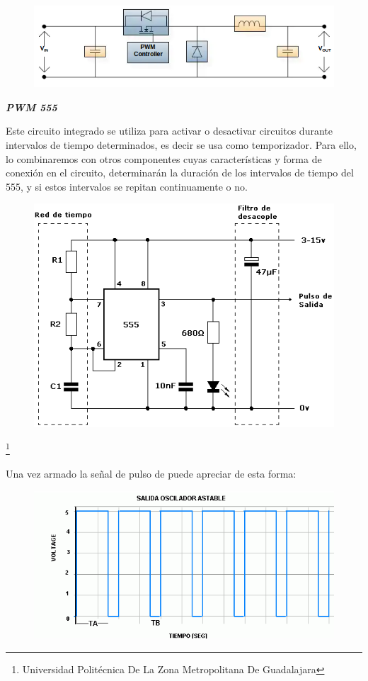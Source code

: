 \documentclass[11pt,a4paper]{article}
\begin{document}
\begin{figure}[hbtp]
\centering
\includegraphics[scale=0.80]{1.png}
\end{figure} 

\textbf{\textit{PWM 555}}


Este circuito integrado se utiliza para activar o desactivar circuitos durante intervalos de tiempo determinados, es decir se usa como temporizador. Para ello, lo combinaremos con otros componentes cuyas características y forma de conexión en el circuito, determinarán la duración de los intervalos de tiempo del 555, y si estos intervalos se repitan continuamente o no.


\begin{figure}[hbtp]
\centering
\includegraphics[scale=0.50]{2.png}
\end{figure} 

\footnote{Universidad Politécnica De La Zona Metropolitana De Guadalajara} 

\newpage

Una vez armado la señal de pulso de puede apreciar de esta forma:

\begin{figure}[hbtp]
\centering
\includegraphics[scale=0.50]{3.png}
\end{figure} 
\end{document}
